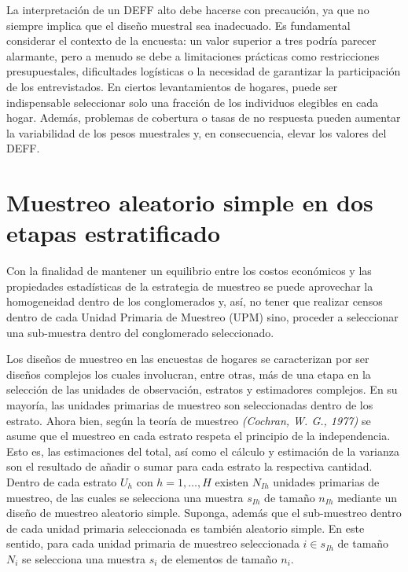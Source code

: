 \documentclass[
  12pt,
]{book}
\begin{document}
La interpretación de un DEFF alto debe hacerse con precaución, ya que no siempre implica que el diseño muestral sea inadecuado. Es fundamental considerar el contexto de la encuesta: un valor superior a tres podría parecer alarmante, pero a menudo se debe a limitaciones prácticas como restricciones presupuestales, dificultades logísticas o la necesidad de garantizar la participación de los entrevistados. En ciertos levantamientos de hogares, puede ser indispensable seleccionar solo una fracción de los individuos elegibles en cada hogar. Además, problemas de cobertura o tasas de no respuesta pueden aumentar la variabilidad de los pesos muestrales y, en consecuencia, elevar los valores del DEFF.

\section{Muestreo aleatorio simple en dos etapas estratificado}\label{muestreo-aleatorio-simple-en-dos-etapas-estratificado}

Con la finalidad de mantener un equilibrio entre los costos económicos y las propiedades estadísticas de la estrategia de muestreo se puede aprovechar la homogeneidad dentro de los conglomerados y, así, no tener que realizar censos dentro de cada Unidad Primaria de Muestreo (UPM) sino, proceder a seleccionar una sub-muestra dentro del conglomerado seleccionado.

Los diseños de muestreo en las encuestas de hogares se caracterizan por ser diseños complejos los cuales involucran, entre otras, más de una etapa en la selección de las unidades de observación, estratos y estimadores complejos. En su mayoría, las unidades primarias de muestreo son seleccionadas dentro de los estrato. Ahora bien, según la teoría de muestreo \emph{(Cochran, W. G., 1977)} se asume que el muestreo en cada estrato respeta el principio de la independencia. Esto es, las estimaciones del total, así como el cálculo y estimación de la varianza son el resultado de añadir o sumar para cada estrato la respectiva cantidad. Dentro de cada estrato \(U_h\) con \(h=1,\ldots, H\) existen \(N_{Ih}\) unidades primarias de muestreo, de las cuales se selecciona una muestra \(s_{Ih}\) de tamaño \(n_{Ih}\) mediante un diseño de muestreo aleatorio simple. Suponga, además que el sub-muestreo dentro de cada unidad primaria seleccionada es también aleatorio simple. En este sentido, para cada unidad primaria de muestreo seleccionada \(i\in s_{Ih}\) de tamaño \(N_i\) se selecciona una muestra \(s_i\) de elementos de tamaño \(n_i\).
\end{document}
